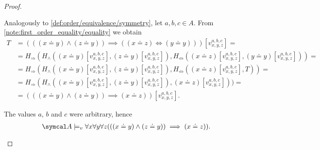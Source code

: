 \begin{proof}
\begin{description}
     Analogously to \ref{def:order/equivalence/symmetry}, let \( a, b, c \in A \). From \cref{note:first_order_equality/equality} we obtain
    \begin{align*}
      T &=
      (((x \doteq y) \land (z \doteq y)) \implies ((x \doteq z) \iff (y \doteq y)))[v_{x,y,z}^{a,b,c}]
      = \\ &=
      H_\Rightarrow(H_\land((x \doteq y)[v_{x,y,z}^{a,b,c}], (z \doteq y)[v_{x,y,z}^{a,b,c}]), H_\Leftrightarrow((x \doteq z)[v_{x,y,z}^{a,b,c}], (y \doteq y)[v_{x,y,z}^{a,b,c}]))
      = \\ &=
      H_\Rightarrow(H_\land((x \doteq y)[v_{x,y,z}^{a,b,c}], (z \doteq y)[v_{x,y,z}^{a,b,c}]), H_\Leftrightarrow((x \doteq z)[v_{x,y,z}^{a,b,c}], T))
      = \\ &=
      H_\Rightarrow(H_\land((x \doteq y)[v_{x,y,z}^{a,b,c}], (z \doteq y)[v_{x,y,z}^{a,b,c}]), (x \doteq z)[v_{x,y,z}^{a,b,c}]))
      = \\ &=
      (((x \doteq y) \land (z \doteq y)) \implies (x \doteq z))[v_{x,y,z}^{a,b,c}].
    \end{align*}

    The values \( a \), \( b \) and \( c \) were arbitrary, hence
    \begin{align*}
      \Cal{A} \models_v \forall x \forall y \forall z (((x \doteq y) \land (z \doteq y)) \implies (x \doteq z)).
    \end{align*}
  \end{description}
\end{proof}
